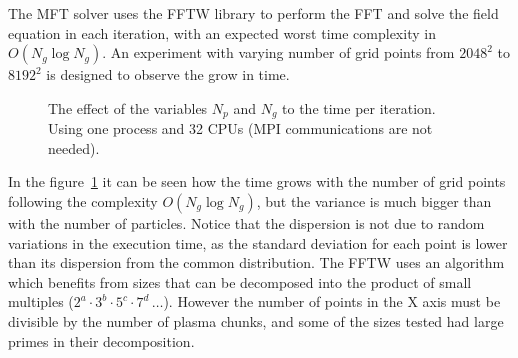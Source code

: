 The MFT solver uses the FFTW library to perform the FFT and solve the field 
equation in each iteration, with an expected worst time complexity in $O(N_g 
\log N_g)$. An experiment with varying number of grid points from $2048^2$ to 
$8192^2$ is designed to observe the grow in time.
%
\begin{figure}[h]%
	\centering
	\caption{The effect of the variables $N_p$ and $N_g$ to the time per 
	iteration. Using one process and 32 CPUs (MPI communications are not needed).}
	\label{fig:gridpoints-32cpus}
\end{figure}%
%
In the figure~\ref{fig:gridpoints-32cpus} it can be seen how the time grows with 
the number of grid points following the complexity $O(N_g \log N_g)$, but the 
variance is much bigger than with the number of particles. Notice that the 
dispersion is not due to random variations in the execution time, as the 
standard deviation for each point is lower than its dispersion from the common 
distribution. The FFTW uses an algorithm which benefits from sizes that can be 
decomposed into the product of small multiples ($2^a \cdot 3^b\cdot 5^c\cdot 
7^d\,\ldots$).  However the number of points in the X axis must be divisible by 
the number of plasma chunks, and some of the sizes tested had large primes in 
their decomposition.
%
%

